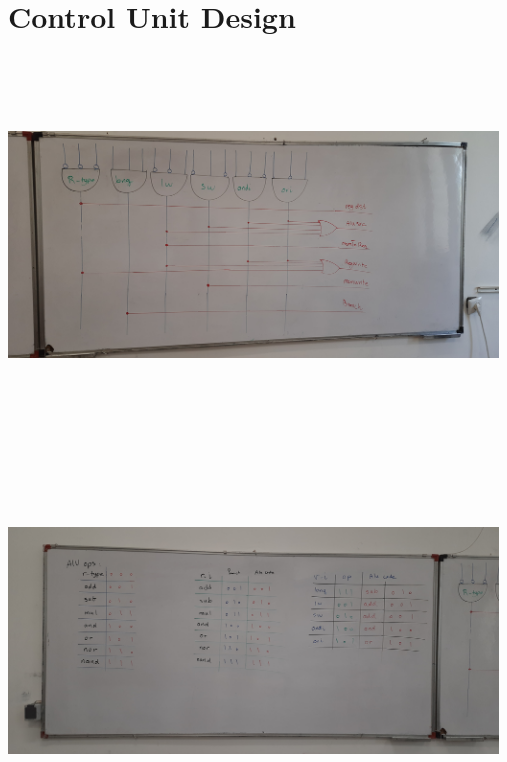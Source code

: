 \documentclass[12pt, dvipsnames, svgnames, x11names, oneside]{book}
\begin{document}
		\section{Control Unit Design}
			\begin{center}
				\includegraphics[width=13cm, height=10cm]{./images/cu}
			\end{center}
			\begin{center}
				\includegraphics[width=13cm, height=10cm]{./images/aluctrl}
			\end{center}
			
\end{document}
